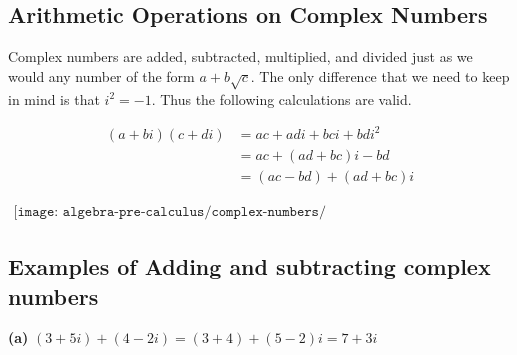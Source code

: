 \subsection{Arithmetic Operations on Complex Numbers}

Complex numbers are added, subtracted, multiplied, and divided just as we would any
number of the form $a+b\sqrt{c}$. The only difference that we need to keep in mind is that $i^2=-1$. Thus the following calculations are valid.

\begin{align*}
    (a+bi)(c+di)&= ac+adi+bci+bdi^2 \\
    &=ac+(ad+bc)i-bd \\
    &= (ac-bd)+(ad+bc)i
\end{align*}

\begin{align*}
    \texttt{[image: algebra-pre-calculus/complex-numbers/arithmetic\_operations\_complex\_numbers.png]}
\end{align*}

\subsection{Examples of Adding and subtracting complex numbers}
\textbf{(a)} $(3+5i)+(4-2i)=(3+4)+(5-2)i=7+3i$
